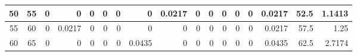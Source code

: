 \begin{table}[ht]
\begin{adjustbox}{width = \textwidth, center}
\begin{tabular}{|cc|r|r|r|r|r|r|r|r|r|r|r|r|r|r|r|}
            \cellcolor[HTML]{C8E4BE}\hspace{4.5pt}50\hspace{4.5pt}             & \cellcolor[HTML]{D9EAD3}55             & 0                                              & 0                                              & 0                                              & 0                                              & 0                                              & 0                                              & \cellcolor[HTML]{C7E9D8}0.0217                 & 0                                               & 0                                               & 0                                               & 0                                               & 0                                               & \cellcolor[HTML]{D9D2E9}0.0217                                                  & \cellcolor[HTML]{D9D2E9}52.5                                            & \cellcolor[HTML]{D9D2E9}1.1413                                                                   \\ \hline
            \rowcolor[HTML]{FFFFFF} 
            \cellcolor[HTML]{C8E4BE}55             & \cellcolor[HTML]{D9EAD3}60             & 0                                              & \cellcolor[HTML]{C7E9D8}0.0217                 & 0                                              & 0                                              & 0                                              & 0                                              & 0                                              & 0                                               & 0                                               & 0                                               & 0                                               & 0                                               & \cellcolor[HTML]{D9D2E9}0.0217                                                  & \cellcolor[HTML]{D9D2E9}57.5                                            & \cellcolor[HTML]{D9D2E9}1.25                                                                     \\ \hline
            \rowcolor[HTML]{FFFFFF} 
            \cellcolor[HTML]{C8E4BE}60             & \cellcolor[HTML]{D9EAD3}65             & 0                                              & 0                                              & 0                                              & 0                                              & 0                                              & \cellcolor[HTML]{8FD2B1}0.0435                 & 0                                              & 0                                               & 0                                               & 0                                               & 0                                               & 0                                               & \cellcolor[HTML]{D9D2E9}0.0435                                                  & \cellcolor[HTML]{D9D2E9}62.5                                            & \cellcolor[HTML]{D9D2E9}2.7174                                                                   \\ \hline

\end{tabular}
\end{adjustbox}
\end{table}
